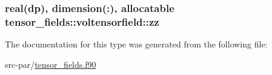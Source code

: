 \hypertarget{structtensor__fields_1_1voltensorfield_ad1d7d9d3dd93ed15348d66332f35ab00}{
\subsubsection[{zz}]{\setlength{\rightskip}{0pt plus 5cm}real(dp), dimension(\-:), allocatable tensor\-\_\-fields\-::voltensorfield\-::zz}}\label{structtensor__fields_1_1voltensorfield_ad1d7d9d3dd93ed15348d66332f35ab00}


The documentation for this type was generated from the following file\-:\begin{DoxyCompactItemize}
\item 
src-\/par/\hyperlink{tensor__fields_8f90}{tensor\-\_\-fields.\-f90}\end{DoxyCompactItemize}
